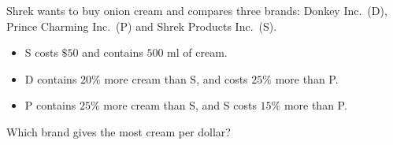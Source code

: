 Shrek wants to buy onion cream and compares three brands: Donkey Inc.\ (D), Prince Charming Inc.\ (P) and Shrek Products Inc.\ (S).
\begin{itemize}
\item S costs $\$50$ and contains $500$ ml of cream.
\item D contains $20\%$ more cream than S, and costs $25\%$ more than P.
\item P contains $25\%$ more cream than S, and S costs $15\%$ more than P.
\end{itemize}
Which brand gives the most cream per dollar?
